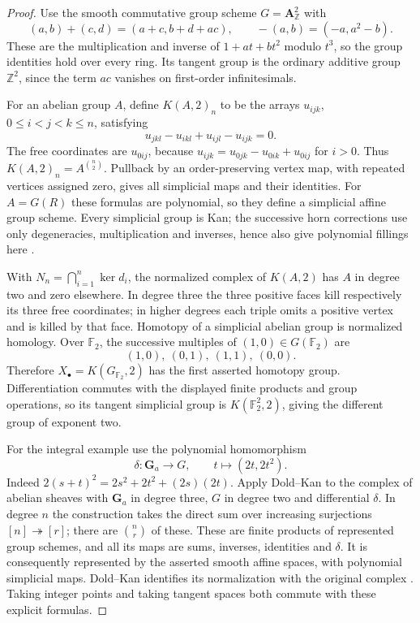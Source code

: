 \documentclass[11pt,a4paper]{article}
\theoremstyle{definition}
\newcommand{\Z}{\mathbb Z}
\newcommand{\F}{\mathbb F}
\begin{document}
\begin{proof}
Use the smooth commutative group scheme $G=\mathbf A^2_\Z$ with
\[
 (a,b)+(c,d)=(a+c,b+d+ac),\qquad
 -(a,b)=(-a,a^2-b).
\]
These are the multiplication and inverse of $1+at+bt^2$ modulo $t^3$, so the group identities hold over every ring. Its tangent group is the ordinary additive group $\Z^2$, since the term $ac$ vanishes on first-order infinitesimals.

For an abelian group $A$, define $K(A,2)_n$ to be the arrays $u_{ijk}$, $0\le i<j<k\le n$, satisfying
\[
 u_{jkl}-u_{ikl}+u_{ijl}-u_{ijk}=0.
\]
The free coordinates are $u_{0ij}$, because
$u_{ijk}=u_{0jk}-u_{0ik}+u_{0ij}$ for $i>0$.
Thus $K(A,2)_n=A^{\binom n2}$. Pullback by an order-preserving vertex map, with repeated vertices assigned zero, gives all simplicial maps and their identities. For $A=G(R)$ these formulas are polynomial, so they define a simplicial affine group scheme. Every simplicial group is Kan; the successive horn corrections use only degeneracies, multiplication and inverses, hence also give polynomial fillings here \cite[Lemma~14.31.6, tag 08NZ]{Stacks}.

With $N_n=\bigcap_{i=1}^n\ker d_i$, the normalized complex of $K(A,2)$ has $A$ in degree two and zero elsewhere. In degree three the three positive faces kill respectively its three free coordinates; in higher degrees each triple omits a positive vertex and is killed by that face. Homotopy of a simplicial abelian group is normalized homology. Over $\F_2$, the successive multiples of $(1,0)\in G(\F_2)$ are
\[
 (1,0),\ (0,1),\ (1,1),\ (0,0).
\]
Therefore $X_\bullet=K(G_{\F_2},2)$ has the first asserted homotopy group. Differentiation commutes with the displayed finite products and group operations, so its tangent simplicial group is $K(\F_2^2,2)$, giving the different group of exponent two.

For the integral example use the polynomial homomorphism
\[
 \delta:\mathbf G_a\longrightarrow G,\qquad t\longmapsto(2t,2t^2).
\]
Indeed $2(s+t)^2=2s^2+2t^2+(2s)(2t)$. Apply Dold--Kan to the complex of abelian sheaves with $\mathbf G_a$ in degree three, $G$ in degree two and differential $\delta$. In degree $n$ the construction takes the direct sum over increasing surjections $[n]\twoheadrightarrow[r]$; there are $\binom nr$ of these. These are finite products of represented group schemes, and all its maps are sums, inverses, identities and $\delta$. It is consequently represented by the asserted smooth affine spaces, with polynomial simplicial maps. Dold--Kan identifies its normalization with the original complex \cite[Theorem~14.24.3, tag 019G]{Stacks}. Taking integer points and taking tangent spaces both commute with these explicit formulas.


\end{proof}
\end{document}
